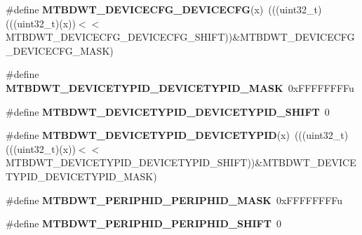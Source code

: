 \begin{DoxyCompactItemize}
\item 
\mbox{\label{group___m_t_b_d_w_t___register___masks_ga9d21c0abbf05163f867fd5f822a182bf}} 
\#define {\bfseries M\+T\+B\+D\+W\+T\+\_\+\+D\+E\+V\+I\+C\+E\+C\+F\+G\+\_\+\+D\+E\+V\+I\+C\+E\+C\+FG}(x)~(((uint32\+\_\+t)(((uint32\+\_\+t)(x))$<$$<$M\+T\+B\+D\+W\+T\+\_\+\+D\+E\+V\+I\+C\+E\+C\+F\+G\+\_\+\+D\+E\+V\+I\+C\+E\+C\+F\+G\+\_\+\+S\+H\+I\+FT))\&M\+T\+B\+D\+W\+T\+\_\+\+D\+E\+V\+I\+C\+E\+C\+F\+G\+\_\+\+D\+E\+V\+I\+C\+E\+C\+F\+G\+\_\+\+M\+A\+SK)
\item 
\mbox{\label{group___m_t_b_d_w_t___register___masks_ga6986bcf237d6ff96e25d6458355ef4b8}} 
\#define {\bfseries M\+T\+B\+D\+W\+T\+\_\+\+D\+E\+V\+I\+C\+E\+T\+Y\+P\+I\+D\+\_\+\+D\+E\+V\+I\+C\+E\+T\+Y\+P\+I\+D\+\_\+\+M\+A\+SK}~0x\+F\+F\+F\+F\+F\+F\+F\+Fu
\item 
\mbox{\label{group___m_t_b_d_w_t___register___masks_ga8caaff8277e4bdaee5735e22d6eb6e7c}} 
\#define {\bfseries M\+T\+B\+D\+W\+T\+\_\+\+D\+E\+V\+I\+C\+E\+T\+Y\+P\+I\+D\+\_\+\+D\+E\+V\+I\+C\+E\+T\+Y\+P\+I\+D\+\_\+\+S\+H\+I\+FT}~0
\item 
\mbox{\label{group___m_t_b_d_w_t___register___masks_gaeb9942e9e9c4c3c52ef545b4d49e113d}} 
\#define {\bfseries M\+T\+B\+D\+W\+T\+\_\+\+D\+E\+V\+I\+C\+E\+T\+Y\+P\+I\+D\+\_\+\+D\+E\+V\+I\+C\+E\+T\+Y\+P\+ID}(x)~(((uint32\+\_\+t)(((uint32\+\_\+t)(x))$<$$<$M\+T\+B\+D\+W\+T\+\_\+\+D\+E\+V\+I\+C\+E\+T\+Y\+P\+I\+D\+\_\+\+D\+E\+V\+I\+C\+E\+T\+Y\+P\+I\+D\+\_\+\+S\+H\+I\+FT))\&M\+T\+B\+D\+W\+T\+\_\+\+D\+E\+V\+I\+C\+E\+T\+Y\+P\+I\+D\+\_\+\+D\+E\+V\+I\+C\+E\+T\+Y\+P\+I\+D\+\_\+\+M\+A\+SK)
\item 
\mbox{\label{group___m_t_b_d_w_t___register___masks_gaa49f29267dcedd6db6aafce7b226182b}} 
\#define {\bfseries M\+T\+B\+D\+W\+T\+\_\+\+P\+E\+R\+I\+P\+H\+I\+D\+\_\+\+P\+E\+R\+I\+P\+H\+I\+D\+\_\+\+M\+A\+SK}~0x\+F\+F\+F\+F\+F\+F\+F\+Fu
\item 
\mbox{\label{group___m_t_b_d_w_t___register___masks_gaa9dfe45d3ebe7c1496f24e1b898ae6a5}} 
\#define {\bfseries M\+T\+B\+D\+W\+T\+\_\+\+P\+E\+R\+I\+P\+H\+I\+D\+\_\+\+P\+E\+R\+I\+P\+H\+I\+D\+\_\+\+S\+H\+I\+FT}~0

\end{DoxyCompactItemize}
